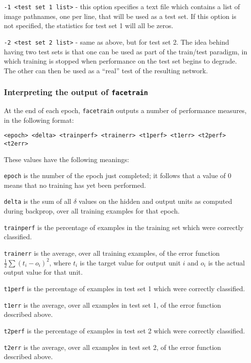 \begin{description}
\item {\tt -1 <test set 1 list>} - this option specifies a text
file which contains a list of image pathnames, one per line, that
will be used as a test set.  If this option is not specified,
the statistics for test set 1 will all be zeros.

\item {\tt -2 <test set 2 list>} - same as above, but for test set 2.
The idea behind having two test sets is that one can be used as part
of the train/test paradigm, in which training is stopped when performance
on the test set begins to degrade.  The other can then be used as a
``real'' test of the resulting network.

\end{description}

\subsubsection{Interpreting the output of {\tt facetrain}}

At the end of each epoch, {\tt facetrain} outputs a number of
performance measures, in the following format:

{\tt <epoch> <delta> <trainperf> <trainerr> <t1perf> <t1err>
<t2perf> <t2err>}

These values have the following meanings:

\begin{description}
\item {\tt epoch} is the number of the epoch just completed; it follows
that a value of 0 means that no training has yet been performed.

\item {\tt delta} is the sum of all $\delta$ values on the hidden and
output units as computed during backprop, over all training examples
for that epoch.

\item {\tt trainperf} is the percentage of examples in the training set
which were correctly classified.

\item {\tt trainerr} is the average, over all training examples,
of the error function $\frac{1}{2} \sum (t_{i} - o_{i})^{2}$, where
$t_{i}$ is the target value for output unit $i$ and $o_{i}$ is the actual
output value for that unit.

\item {\tt t1perf} is the percentage of examples in test set 1
which were correctly classified.

\item {\tt t1err} is the average, over all examples in test set 1,
of the error function described above.

\item {\tt t2perf} is the percentage of examples in test set 2
which were correctly classified.

\item {\tt t2err} is the average, over all examples in test set 2,
of the error function described above.
\end{description}

